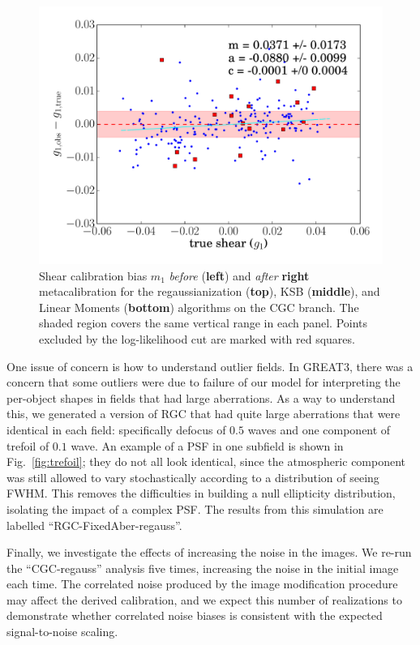 \documentclass[iop]{emulateapj}
\begin{document}
\begin{figure}[t]
\begin{center}
\includegraphics[width=0.46\linewidth]{m1-moments-opt-shear_plots.pdf}
\end{center}
\caption{Shear calibration bias $m_1$ {\it before} ({\bf left}) and
  {\it after} {\bf right} metacalibration for the regaussianization
  ({\bf top}), KSB ({\bf middle}), and Linear Moments ({\bf bottom})
  algorithms on the CGC branch. The shaded region covers the same
  vertical range in each panel.  Points excluded by the log-likelihood
  cut are marked with red squares.}
\label{fig:m_comparison}
\end{figure}

One issue of concern is how to understand outlier fields.  In GREAT3,
there was a concern that some outliers were due to failure of our
model for interpreting the per-object shapes in fields that had large
aberrations. 
As a way to understand this, we generated a version of RGC that had
quite large aberrations that were identical in each field:
specifically defocus of $0.5$ waves and one component of trefoil of
$0.1$ wave.  An example of a PSF in one subfield is shown in
Fig.~\ref{fig:trefoil}; they do not all look identical, since the
atmospheric component was still allowed to vary stochastically
according to a distribution of seeing FWHM. This removes the difficulties
in building a null ellipticity distribution, isolating the impact of a
complex PSF. The results from this simulation are labelled
``RGC-FixedAber-regauss''.


Finally, we investigate the effects of increasing the noise in the
images. We re-run the ``CGC-regauss'' analysis five times, increasing
the noise in the initial image each time. The correlated noise
produced by the image modification procedure may affect the derived
calibration, and we expect this number of realizations to demonstrate
whether correlated noise biases is consistent with the expected 
signal-to-noise scaling. %
%
\end{document}
